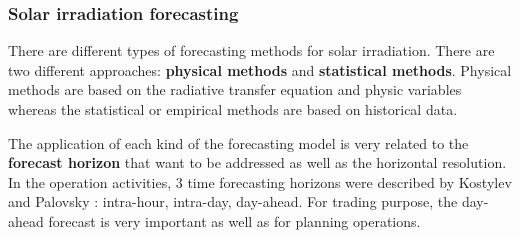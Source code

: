
 
  



\subsubsection{Solar irradiation forecasting}

There are different types of forecasting methods for solar irradiation. There are two different approaches: \textbf{physical methods} and \textbf{statistical methods}. Physical methods are based on the radiative transfer equation and physic variables whereas the statistical or empirical methods are based on historical data.

The application of each kind of the forecasting model is very related to the \textbf{forecast horizon} that want to be addressed as well as the horizontal resolution. In the operation activities, 3 time forecasting horizons were described by Kostylev and Palovsky \cite*{kostylev2011solar}: intra-hour, intra-day, day-ahead. For trading purpose, the day-ahead forecast is very important as well as for planning operations.%

